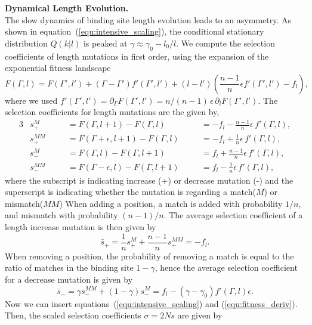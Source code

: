 \textbf{Dynamical Length Evolution.}\\

\noindent The slow dynamics of binding site length evolution leads to an asymmetry. As shown in equation~(\ref{equ:intensive_scaling}), the conditional stationary distribution $Q(k|l)$ is peaked at $\gamma \approx \gamma_0 - l_0/l$. We compute the selection coefficients of length mutations in first order, using the expansion of the exponential fitness landscape
\begin{equation}
	F(\Gamma, l) = F(\Gamma', l') + (\Gamma-\Gamma') f'(\Gamma', l') + (l-l') \left(\frac{n-1}{n}\epsilon f'(\Gamma', l') - f_l\right),
\end{equation}
where we used $f'(\Gamma', l') = \partial_\Gamma F(\Gamma', l') = n/(n-1)\, \epsilon \,\partial_l F(\Gamma', l')$.
The selection coefficients for length mutations are the given by,
\begin{alignat}{3}
	& s_+^M    \quad && = F(\Gamma, l+1) - F(\Gamma, l)          \quad && = -f_l - \frac{n-1}{n}\epsilon\,f'(\Gamma, l),\\
	& s_+^{MM} \quad && = F(\Gamma+\epsilon, l+1) - F(\Gamma, l) \quad && = -f_l + \frac{1}{n}\epsilon\,f'(\Gamma, l),\\
	& s_-^M    \quad && = F(\Gamma, l) - F(\Gamma, l+1)          \quad && = f_l + \frac{n-1}{n}\epsilon\,f'(\Gamma, l),\\
	& s_-^{MM} \quad && = F(\Gamma-\epsilon, l) - F(\Gamma, l+1) \quad && = f_l - \frac{1}{n}\epsilon\,f'(\Gamma, l),
\end{alignat}
where the subscript is indicating increase (+) or decrease mutation (-) and the superscript is indicating whether the mutation is regarding a match($M$) or mismatch($MM$)
When adding a position, a match is added with probability $1/n$, and mismatch with probability $(n-1)/n$. The average selection coefficient of a length increase mutation is then given by
\begin{equation}
	\bar s_+ = \frac{1}{n} s_+^M + \frac{n-1}{n} s_+^{MM} = -f_l.
\end{equation}
When removing a position, the probability of removing a match is equal to the ratio of matches in the binding site $1-\gamma$, hence the average selection coefficient for a decrease mutation is given by 
\begin{equation}
\bar s_- = \gamma s_-^{MM} + (1-\gamma) s_-^{M} = f_l - (\gamma - \gamma_0)f'(\Gamma, l)\epsilon.
\end{equation}
Now we can insert equations~(\ref{equ:intensive_scaling}) and (\ref{equ:fitness_deriv}). Then, the scaled selection coefficients $\sigma = 2Ns$ are given by
